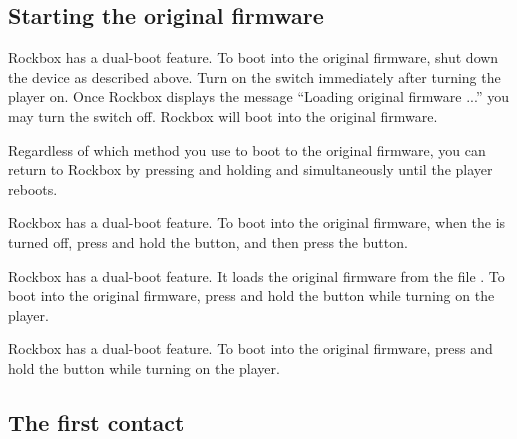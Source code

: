   {
  \subsection{Starting the original firmware}
  \label{ref:Dualboot}
    {
    Rockbox has a dual-boot feature. To boot into the original firmware, shut
    down the device as described above. Turn on the \ButtonHold{} switch
    immediately after turning the player on. Once Rockbox displays the
    message ``Loading original firmware ...'' you may turn the \ButtonHold{}
    switch off. Rockbox will boot into the original firmware.
    
    
    Regardless of which method you use to boot to the original firmware, you can
    return to Rockbox by pressing and holding \ButtonMenu{} and \ButtonSelect{}
    simultaneously until the player reboots.
    }

    {
    Rockbox has a dual-boot feature. To boot into the original firmware,
    when the \dap{} is turned off, press and hold the \ButtonRec{} button,
    and then press the \ButtonOn{} button.
    }

    {
    Rockbox has a dual-boot feature. It loads the original firmware from
    the file . To boot into the original firmware,
    press and hold the \ButtonLeft{} button while turning on the player.
    }
    
    {
    Rockbox has a dual-boot feature. To boot into the original firmware,
    press and hold the \ButtonLeft{} button while turning on the player.
    }
  }

\subsection{The first contact}

